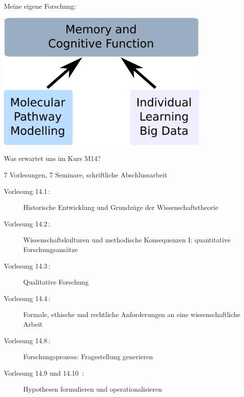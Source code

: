 \documentclass{beamer}
\begin{document}
\begin{frame}{Meine eigene Forschung:}

\centering
\includegraphics[width=0.8\textwidth]{research_triangle_general_blue.png}

\end{frame}


\begin{frame}{Was erwartet uns im Kurs M14?}

7 Vorlesungen, 7 Seminare, schriftliche Abschlussarbeit \\[0.5 cm]

\begin{description}
    \item[Vorlesung 14.1$\,$:] Historische Entwicklung und Grundzüge der Wissenschaftstheorie
\item[Vorlesung 14.2$\,$:] Wissenschaftskulturen und methodische Konsequenzen I: quantitative Forschungsansätze
\item[Vorlesung 14.3$\,$:] Qualitative Forschung
\item[Vorlesung 14.4$\,$:] Formale, ethische und rechtliche Anforderungen an eine wissenschaftliche Arbeit
\item[Vorlesung 14.8$\,$:] Forschungsprozess: Fragestellung generieren
\item[Vorlesung 14.9 und 14.10 $\,$:] Hypothesen formulieren und operationalisieren
\end{description}



\end{frame}
\end{document}
